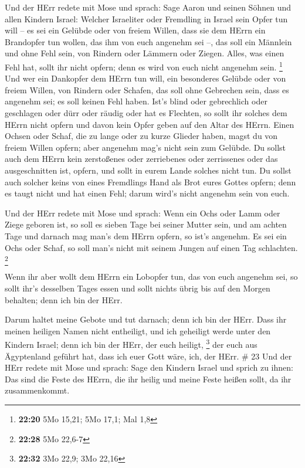  Und der HErr redete mit Mose und sprach: 
Sage Aaron und seinen Söhnen und allen Kindern Israel: Welcher
Israeliter oder Fremdling in Israel sein Opfer tun will -- es sei ein
Gelübde oder von freiem Willen, dass sie dem HErrn ein Brandopfer tun
wollen, das ihm von euch angenehm sei --,  das soll ein
Männlein und ohne Fehl sein, von Rindern oder Lämmern oder Ziegen.
 Alles, was einen Fehl hat, sollt ihr nicht opfern; denn es
wird von euch nicht angenehm sein. \footnote{\textbf{22:20} 5Mo 15,21;
  5Mo 17,1; Mal 1,8}  Und wer ein Dankopfer dem HErrn tun
will, ein besonderes Gelübde oder von freiem Willen, von Rindern oder
Schafen, das soll ohne Gebrechen sein, dass es angenehm sei; es soll
keinen Fehl haben.  Ist's blind oder gebrechlich oder
geschlagen oder dürr oder räudig oder hat es Flechten, so sollt ihr
solches dem HErrn nicht opfern und davon kein Opfer geben auf den Altar
des HErrn.  Einen Ochsen oder Schaf, die zu lange oder zu
kurze Glieder haben, magst du von freiem Willen opfern; aber angenehm
mag's nicht sein zum Gelübde.  Du sollst auch dem HErrn
kein zerstoßenes oder zerriebenes oder zerrissenes oder das
ausgeschnitten ist, opfern, und sollt in eurem Lande solches nicht tun.
 Du sollst auch solcher keins von eines Fremdlings Hand als
Brot eures Gottes opfern; denn es taugt nicht und hat einen Fehl; darum
wird's nicht angenehm sein von euch.

 Und der HErr redete mit Mose und sprach: 
Wenn ein Ochs oder Lamm oder Ziege geboren ist, so soll es sieben Tage
bei seiner Mutter sein, und am achten Tage und darnach mag man's dem
HErrn opfern, so ist's angenehm.  Es sei ein Ochs oder
Schaf, so soll man's nicht mit seinem Jungen auf einen Tag schlachten.
\footnote{\textbf{22:28} 5Mo 22,6-7}

 Wenn ihr aber wollt dem HErrn ein Lobopfer tun, das von
euch angenehm sei,  so sollt ihr's desselben Tages essen
und sollt nichts übrig bis auf den Morgen behalten; denn ich bin der
HErr.

 Darum haltet meine Gebote und tut darnach; denn ich bin
der HErr.  Dass ihr meinen heiligen Namen nicht entheiligt,
und ich geheiligt werde unter den Kindern Israel; denn ich bin der HErr,
der euch heiligt, \footnote{\textbf{22:32} 3Mo 22,9; 3Mo 22,16}
 der euch aus Ägyptenland geführt hat, dass ich euer Gott
wäre, ich, der HErr. \# 23  Und der HErr redete mit Mose und
sprach:  Sage den Kindern Israel und sprich zu ihnen: Das
sind die Feste des HErrn, die ihr heilig und meine Feste heißen sollt,
da ihr zusammenkommt.

